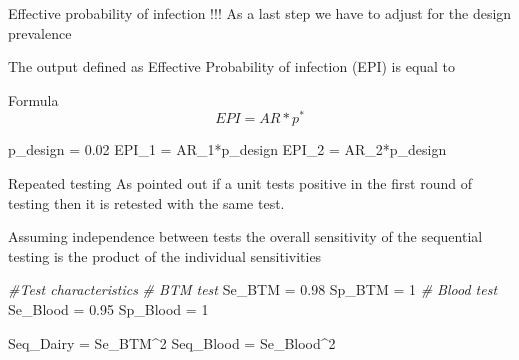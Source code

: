 \documentclass[
  ignorenonframetext,
]{beamer}
\newenvironment{Shaded}{\begin{snugshade}}{\end{snugshade}}
\newcommand{\CommentTok}[1]{\textcolor[rgb]{0.56,0.35,0.01}{\textit{#1}}}
\newcommand{\DecValTok}[1]{\textcolor[rgb]{0.00,0.00,0.81}{#1}}
\newcommand{\FloatTok}[1]{\textcolor[rgb]{0.00,0.00,0.81}{#1}}
\newcommand{\NormalTok}[1]{#1}
\newcommand{\OtherTok}[1]{\textcolor[rgb]{0.56,0.35,0.01}{#1}}
\newcommand{\SpecialCharTok}[1]{\textcolor[rgb]{0.00,0.00,0.00}{#1}}
\begin{document}
\begin{frame}[fragile]{Effective probability of infection}
\protect\hypertarget{effective-probability-of-infection}{}
!!! As a last step we have to adjust for the design prevalence

The output defined as Effective Probability of infection (EPI) is equal
to

\begin{block}{Formula}
  \begin{equation}
         EPI = AR*p^*
  \end{equation}
\end{block}

\begin{Shaded}
\begin{Highlighting}[]
\NormalTok{p\_design }\OtherTok{=} \FloatTok{0.02}
\NormalTok{EPI\_1 }\OtherTok{=}\NormalTok{ AR\_1}\SpecialCharTok{*}\NormalTok{p\_design}
\NormalTok{EPI\_2 }\OtherTok{=}\NormalTok{ AR\_2}\SpecialCharTok{*}\NormalTok{p\_design}
\end{Highlighting}
\end{Shaded}
\end{frame}

\begin{frame}[fragile]{Repeated testing}
\protect\hypertarget{repeated-testing}{}
As pointed out if a unit tests positive in the first round of testing
then it is retested with the same test.

Assuming independence between tests the overall sensitivity of the
sequential testing is the product of the individual sensitivities

\begin{Shaded}
\begin{Highlighting}[]
\CommentTok{\#Test characteristics}
\CommentTok{\# BTM test}
\NormalTok{Se\_BTM }\OtherTok{=} \FloatTok{0.98}
\NormalTok{Sp\_BTM }\OtherTok{=} \DecValTok{1}
\CommentTok{\# Blood test}
\NormalTok{Se\_Blood }\OtherTok{=} \FloatTok{0.95}
\NormalTok{Sp\_Blood }\OtherTok{=} \DecValTok{1}

\NormalTok{Seq\_Dairy }\OtherTok{=}\NormalTok{ Se\_BTM}\SpecialCharTok{\^{}}\DecValTok{2}
\NormalTok{Seq\_Blood }\OtherTok{=}\NormalTok{ Se\_Blood}\SpecialCharTok{\^{}}\DecValTok{2}
\end{Highlighting}
\end{Shaded}
\end{frame}
\end{document}
